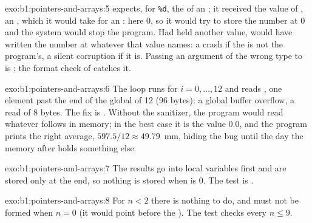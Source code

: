 \begin{solution}{exo:b1:pointers-and-arrays:5}
 expects, for \texttt{\%d}, the  of an ; it received the value of , an ,
which it would take for an : here 0, so it would try to store the number at  0 and the system would stop
the program. Had  held another value,  would have written the number at whatever  that value
names: a crash if the  is not the program's, a silent corruption if it is. Passing an argument of the wrong
type to  is ; the format check of  catches it.
\end{solution}

\begin{solution}{exo:b1:pointers-and-arrays:6}
The loop runs for $i = 0, \dots, 12$ and reads , one element past the end of the global  of 12
 (96 bytes): a global buffer overflow, a read of 8 bytes. The fix is . Without the
sanitizer, the program would read whatever follows  in memory; in the best case it is the value 0.0, and
the program prints the right average, $597.5 / 12 \approx 49.79$~mm, hiding the bug until the day the memory after
 holds something else.
\end{solution}

\begin{solution}{exo:b1:pointers-and-arrays:7}
The results go into local variables first and are stored only at the end, so nothing is stored when  is 0. The
test is .
\end{solution}

\begin{solution}{exo:b1:pointers-and-arrays:8}
For $n < 2$ there is nothing to do, and  must not be formed when $n = 0$ (it would point before the
). The test  checks every $n \leq 9$.
\end{solution}

